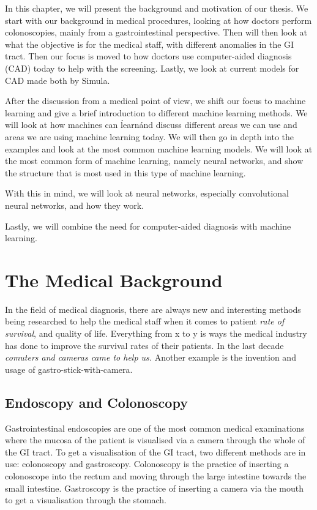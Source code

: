 In this chapter, we will present the background and motivation of our thesis.
We start with our background in medical procedures, looking at how doctors perform colonoscopies, mainly from a gastrointestinal perspective.
Then will then look at what the objective is for the medical staff, with different anomalies in the GI tract. Then our focus is moved to how doctors use computer-aided diagnosis (CAD) today to help with the screening. Lastly, we look at current models for CAD made both by Simula.

After the discussion from a medical point of view, we shift our focus to machine learning and give a brief introduction to different machine learning methods. We will look at how machines can \'learn\' and discuss different areas we can use and areas we are using machine learning today.
We will then go in depth into the examples and look at the most common machine learning models. We will look at the most common form of machine learning, namely neural networks, and show the structure that is most used in this type of machine learning. 

 With this in mind, we will look
at neural networks, especially convolutional neural networks, and how they work.

Lastly, we will combine the need for computer-aided diagnosis with machine learning.

\section{The Medical Background}
In the field of medical diagnosis, there are always new and interesting methods being researched to help the medical staff when it comes to patient \textit{rate of survival}, and quality of life. 
Everything from x to y is ways the medical industry has done to improve the survival rates of their patients.
In the last decade \textit{comuters and cameras came to help us.}
Another example is the invention and usage of gastro-stick-with-camera.


\subsection{Endoscopy and Colonoscopy}
Gastrointestinal endoscopies are one of the most common medical examinations where the mucosa of the patient is visualised via a camera through the whole of the GI tract. 
To get a visualisation of the GI tract, two different methods are in use: colonoscopy and gastroscopy. 
Colonoscopy is the practice of inserting a colonoscope into the rectum and moving through the large intestine towards the small intestine.  Gastroscopy is the practice of inserting a camera via the mouth to get a visualisation through the stomach.

